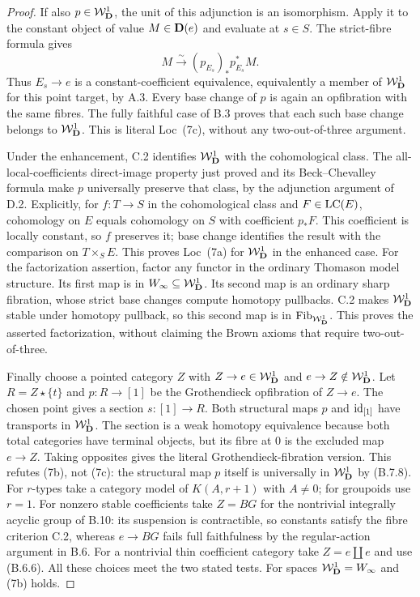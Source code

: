 \begin{proof}
If also $p\in\mathcal W_{\mathbf D}^{1}$, the unit of this adjunction
is an isomorphism. Apply it to the constant
object of value $M\in\mathbf D(e)$ and evaluate at
$s\in S$. The strict-fibre formula gives
\[
 M\xrightarrow{\sim}
 (p_{E_s})_*p_{E_s}^*M.
\tag{B.7.8}
\]
Thus $E_s\to e$ is a constant-coefficient
equivalence, equivalently a member of $\mathcal W_{\mathbf D}^{1}$
for this point target, by A.3. Every base change
of $p$ is again an opfibration with the same
fibres. The fully faithful case of B.3 proves
that each such base change belongs to $\mathcal W_{\mathbf D}^{1}$.
This is literal Loc~(7c), without any two-out-of-three
argument.

Under the enhancement, C.2 identifies
$\mathcal W_{\mathbf D}^{1}$ with the cohomological class. The
all-local-coefficients direct-image property
just proved and its Beck--Chevalley formula
make $p$ universally preserve that class, by
the adjunction argument of D.2. Explicitly,
for $f:T\to S$ in the cohomological class and
$F\in\operatorname{LC}(E)$, cohomology on $E$ equals
cohomology on $S$ with coefficient $p_*F$.
This coefficient is locally constant, so $f$
preserves it; base change identifies the result
with the comparison on $T\times_SE$.
This proves Loc~(7a) for $\mathcal W_{\mathbf D}^{1}$ in the
enhanced case. For the factorization assertion,
factor any functor in the ordinary Thomason
model structure. Its first map is in
$W_\infty\subseteq\mathcal W_{\mathbf D}^{1}$. Its second map
is an ordinary sharp fibration, whose strict
base changes compute homotopy pullbacks. C.2
makes $\mathcal W_{\mathbf D}^{1}$ stable under homotopy pullback,
so this second map is in
$\operatorname{Fib}_{\mathcal W_{\mathbf D}^{1}}$. This proves
the asserted factorization, without claiming
the Brown axioms that require two-out-of-three.

Finally choose a pointed category $Z$ with
$Z\to e\in\mathcal W_{\mathbf D}^{1}$ and $e\to Z\notin\mathcal W_{\mathbf D}^{1}$.
Let $R=Z\star\{t\}$ and $p:R\to[1]$ be
the Grothendieck opfibration of $Z\to e$.
The chosen point gives a section
$s:[1]\to R$. Both structural maps $p$ and
$\mathrm{id}_{[1]}$ have transports in $\mathcal W_{\mathbf D}^{1}$.
The section is a weak homotopy equivalence
because both total categories have terminal
objects, but its fibre at $0$ is the excluded
map $e\to Z$. Taking opposites gives the
literal Grothendieck-fibration version. This
refutes (7b), not (7c): the structural map $p$
itself is universally in $\mathcal W_{\mathbf D}^{1}$ by (B.7.8).
For $r$-types take a category model of
$K(A,r+1)$ with $A\ne0$; for groupoids use
$r=1$. For nonzero stable coefficients take
$Z=BG$ for the nontrivial integrally acyclic
group of B.10: its suspension is contractible,
so constants satisfy the fibre criterion C.2,
whereas $e\to BG$ fails full faithfulness by
the regular-action argument in B.6. For a
nontrivial thin coefficient category take
$Z=e\amalg e$ and use (B.6.6).
All these choices meet the two stated tests.
For spaces $\mathcal W_{\mathbf D}^{1}=W_\infty$ and (7b) holds.
\end{proof}


